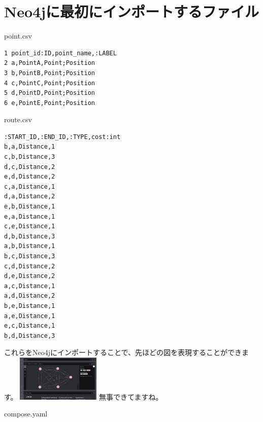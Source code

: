 \section{Neo4jに最初にインポートするファイル}
point.csv
\begin{tcolorbox}[breakable]
    \begin{verbatim}
1 point_id:ID,point_name,:LABEL
2 a,PointA,Point;Position
3 b,PointB,Point;Position
4 c,PointC,Point;Position
5 d,PointD,Point;Position
6 e,PointE,Point;Position
\end{verbatim}
\end{tcolorbox}

route.csv
\begin{tcolorbox}[breakable]
    \begin{verbatim}
:START_ID,:END_ID,:TYPE,cost:int
b,a,Distance,1
c,b,Distance,3
d,c,Distance,2
e,d,Distance,2
c,a,Distance,1
d,a,Distance,2
e,b,Distance,1
e,a,Distance,1
c,e,Distance,1
d,b,Distance,3
a,b,Distance,1
b,c,Distance,3
c,d,Distance,2
d,e,Distance,2
a,c,Distance,1
a,d,Distance,2
b,e,Distance,1
a,e,Distance,1
e,c,Distance,1
b,d,Distance,3
\end{verbatim}
\end{tcolorbox}
これらをNeo4jにインポートすることで、先ほどの図を表現することができます。
\includegraphics[width=4cm]{./image/03-Tech/chap3/neo4j_result.png}
無事できてますね。

compose.yaml
